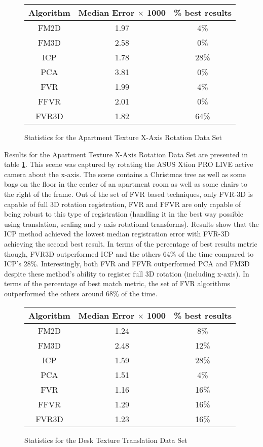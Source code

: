 \begin{figure}
\centering
\begin{tabular}{ccc}
\hline
\textbf{Algorithm} & \textbf{Median Error $\times$ 1000} & \textbf{\% best results}\\ \hline
FM2D	& 1.97 & 4\%\\
FM3D	& 2.58 & 0\%\\
ICP	& 1.78 & 28\%\\
PCA	& 3.81 & 0\%\\
FVR	& 1.99 & 4\%\\
FFVR	& 2.01 & 0\%\\
FVR3D	& 1.82 & 64\%\\
\end{tabular}
\caption{Statistics for the Apartment Texture X-Axis Rotation Data Set}
\label{tab:apartmenttexturex-axisrotation}
\end{figure} 

Results for the Apartment Texture X-Axis Rotation Data Set are presented in table \ref{tab:apartmenttexturex-axisrotation}. This scene was captured by rotating the ASUS Xtion PRO LIVE active camera about the x-axis. The scene contains a Christmas tree as well as some bags on the floor in the center of an apartment room as well as some chairs to the right of the frame. Out of the set of FVR based techniques, only FVR-3D is capable of full 3D rotation registration, FVR and FFVR are only capable of being robust to this type of registration (handling it in the best way possible using translation, scaling and y-axis rotational transforms). Results show that the ICP method achieved the lowest median registration error with FVR-3D achieving the second best result. In terms of the percentage of best results metric though, FVR3D outperformed ICP and the others 64\% of the time compared to ICP's 28\%. Interestingly, both FVR and FFVR outperformed PCA and FM3D despite these method's ability to register full 3D rotation (including x-axis). In terms of the percentage of best match metric, the set of FVR algorithms outperformed the others around 68\% of the time. \\

\begin{figure}
\centering
\begin{tabular}{ccc}
\hline
\textbf{Algorithm} & \textbf{Median Error $\times$ 1000} & \textbf{\% best results}\\ \hline
FM2D	& 1.24 & 8\%\\
FM3D	& 2.48 & 12\%\\
ICP	& 1.59 & 28\%\\
PCA	& 1.51 & 4\%\\
FVR	& 1.16 & 16\%\\
FFVR	& 1.29 & 16\%\\
FVR3D	& 1.23 & 16\%\\
\end{tabular}
\caption{Statistics for the Desk Texture Translation Data Set}
\label{tab:desktexturetranslation}
\end{figure} 

